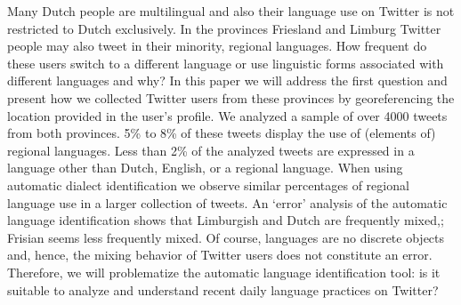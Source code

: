 \documentclass[10pt, a4paper, twopage, headinclude, footinclude, BCOR5mm]{scrartcl}
\begin{document}
        \begin{table}[t!]
    \end{table}

\noindent
Many Dutch people are multilingual and also their language use on Twitter is not restricted to Dutch exclusively. In the provinces Friesland and Limburg Twitter people may also tweet in their minority, regional languages. How frequent do these users switch to a different language or use linguistic forms associated with different languages and why? In this paper we will address the first question and present how we collected Twitter users from these provinces by georeferencing the location provided in the user's profile. We analyzed a sample of over 4000 tweets from both provinces. 5\% to 8\% of these tweets display the use of (elements of) regional languages. Less than 2\% of the analyzed tweets are expressed in a language other than Dutch, English, or a regional language. When using automatic dialect identification we observe similar percentages of regional language use in a larger collection of tweets. An `error' analysis of the automatic language identification shows that Limburgish and Dutch are frequently mixed,; Frisian seems less frequently mixed. Of course, languages are no discrete objects and, hence, the mixing behavior of Twitter users does not constitute an error. Therefore, we will problematize the automatic language identification tool: is it suitable to analyze and understand recent daily language practices on Twitter?
\end{document}
